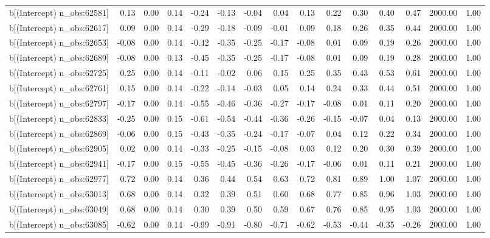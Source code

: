 \begin{table}[ht]
\begin{tabular}{rrrrrrrrrrrrrrr}
  b[(Intercept) n\_obs:62581] & 0.13 & 0.00 & 0.14 & -0.24 & -0.13 & -0.04 & 0.04 & 0.13 & 0.22 & 0.30 & 0.40 & 0.47 & 2000.00 & 1.00 \\ 
  b[(Intercept) n\_obs:62617] & 0.09 & 0.00 & 0.14 & -0.29 & -0.18 & -0.09 & -0.01 & 0.09 & 0.18 & 0.26 & 0.35 & 0.44 & 2000.00 & 1.00 \\ 
  b[(Intercept) n\_obs:62653] & -0.08 & 0.00 & 0.14 & -0.42 & -0.35 & -0.25 & -0.17 & -0.08 & 0.01 & 0.09 & 0.19 & 0.26 & 2000.00 & 1.00 \\ 
  b[(Intercept) n\_obs:62689] & -0.08 & 0.00 & 0.13 & -0.45 & -0.35 & -0.25 & -0.17 & -0.08 & 0.01 & 0.09 & 0.19 & 0.28 & 2000.00 & 1.00 \\ 
  b[(Intercept) n\_obs:62725] & 0.25 & 0.00 & 0.14 & -0.11 & -0.02 & 0.06 & 0.15 & 0.25 & 0.35 & 0.43 & 0.53 & 0.61 & 2000.00 & 1.00 \\ 
  b[(Intercept) n\_obs:62761] & 0.15 & 0.00 & 0.14 & -0.22 & -0.14 & -0.03 & 0.05 & 0.14 & 0.24 & 0.33 & 0.44 & 0.51 & 2000.00 & 1.00 \\ 
  b[(Intercept) n\_obs:62797] & -0.17 & 0.00 & 0.14 & -0.55 & -0.46 & -0.36 & -0.27 & -0.17 & -0.08 & 0.01 & 0.11 & 0.20 & 2000.00 & 1.00 \\ 
  b[(Intercept) n\_obs:62833] & -0.25 & 0.00 & 0.15 & -0.61 & -0.54 & -0.44 & -0.36 & -0.26 & -0.15 & -0.07 & 0.04 & 0.13 & 2000.00 & 1.00 \\ 
  b[(Intercept) n\_obs:62869] & -0.06 & 0.00 & 0.15 & -0.43 & -0.35 & -0.24 & -0.17 & -0.07 & 0.04 & 0.12 & 0.22 & 0.34 & 2000.00 & 1.00 \\ 
  b[(Intercept) n\_obs:62905] & 0.02 & 0.00 & 0.14 & -0.33 & -0.25 & -0.15 & -0.08 & 0.03 & 0.12 & 0.20 & 0.30 & 0.39 & 2000.00 & 1.00 \\ 
  b[(Intercept) n\_obs:62941] & -0.17 & 0.00 & 0.15 & -0.55 & -0.45 & -0.36 & -0.26 & -0.17 & -0.06 & 0.01 & 0.11 & 0.21 & 2000.00 & 1.00 \\ 
  b[(Intercept) n\_obs:62977] & 0.72 & 0.00 & 0.14 & 0.36 & 0.44 & 0.54 & 0.63 & 0.72 & 0.81 & 0.89 & 1.00 & 1.07 & 2000.00 & 1.00 \\ 
  b[(Intercept) n\_obs:63013] & 0.68 & 0.00 & 0.14 & 0.32 & 0.39 & 0.51 & 0.60 & 0.68 & 0.77 & 0.85 & 0.96 & 1.03 & 2000.00 & 1.00 \\ 
  b[(Intercept) n\_obs:63049] & 0.68 & 0.00 & 0.14 & 0.30 & 0.39 & 0.50 & 0.59 & 0.67 & 0.76 & 0.85 & 0.95 & 1.03 & 2000.00 & 1.00 \\ 
  b[(Intercept) n\_obs:63085] & -0.62 & 0.00 & 0.14 & -0.99 & -0.91 & -0.80 & -0.71 & -0.62 & -0.53 & -0.44 & -0.35 & -0.26 & 2000.00 & 1.00 \\ 

\end{tabular}
\end{table}
